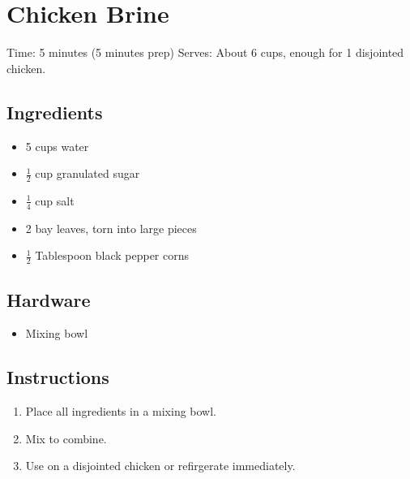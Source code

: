 \section{Chicken Brine}
\label{chickenBrine}
\setcounter{secnumdepth}{0}
Time: 5 minutes (5 minutes prep)
Serves: About 6 cups, enough for 1 disjointed chicken.

\begin{multicols}{2}
\subsection*{Ingredients}
\begin{itemize}
    \item 5 cups water
    \item \( \frac{1}{2} \) cup granulated sugar
    \item \( \frac{1}{4} \) cup salt
    \item 2 bay leaves, torn into large pieces
    \item \( \frac{1}{2} \) Tablespoon black pepper corns
\end{itemize}

\subsection*{Hardware}
\begin{itemize}
    \item Mixing bowl
\end{itemize}
\clearpage

\subsection*{Instructions}
\begin{enumerate}
    \item Place all ingredients in a mixing bowl.
    \item Mix to combine.
    \item Use on a disjointed chicken or refirgerate immediately.
\end{enumerate}


\end{multicols}
